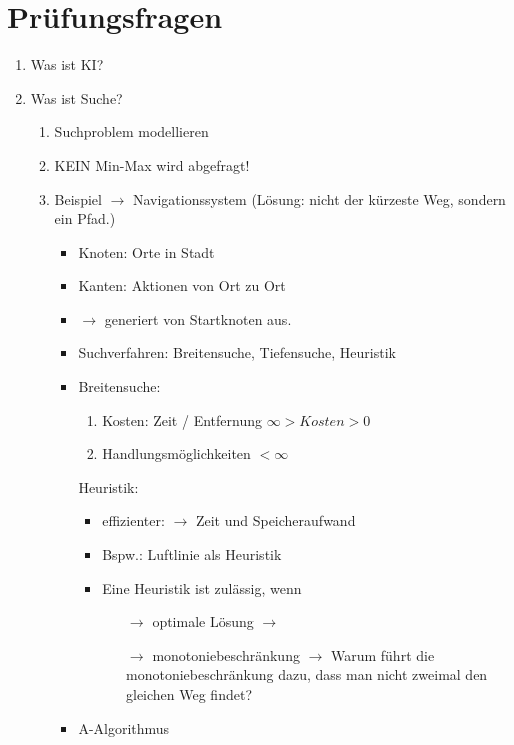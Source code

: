 \documentclass[runningheads,deutsch]{llncs}
\begin{document}
\section{Prüfungsfragen}
\begin{enumerate}
    \item Was ist KI?
    \item Was ist Suche?
    \begin{enumerate}
        \item Suchproblem modellieren
        \item KEIN Min-Max wird abgefragt!
        \item Beispiel $\rightarrow$ Navigationssystem (Lösung: nicht der kürzeste Weg, sondern ein Pfad.)
        \begin{itemize}
            \item Knoten: Orte in Stadt
            \item Kanten: Aktionen von Ort zu Ort
            \item $\rightarrow$ generiert von Startknoten aus.
            \item Suchverfahren: Breitensuche, Tiefensuche, Heuristik
            \item Breitensuche:
            \begin{enumerate}
                \item Kosten: Zeit / Entfernung $\infty > Kosten > 0$
                \item Handlungsmöglichkeiten $< \infty$
            \end{enumerate}
            Heuristik:
            \begin{itemize}
                \item effizienter: $\rightarrow$ Zeit und Speicheraufwand
                \item Bspw.: Luftlinie als Heuristik
                \item Eine Heuristik ist zulässig, wenn
                \begin{itemize}
                    \item[$\rightarrow$] optimale Lösung $\rightarrow$ 
                    \item[$\rightarrow$] monotoniebeschränkung $\rightarrow$ Warum führt die monotoniebeschränkung dazu, dass man nicht zweimal den gleichen Weg findet? 
                \end{itemize}
            \end{itemize}
            \item A-Algorithmus
            \begin{itemize}

\end{itemize}
\end{itemize}
\end{enumerate}
\end{enumerate}
\end{document}
